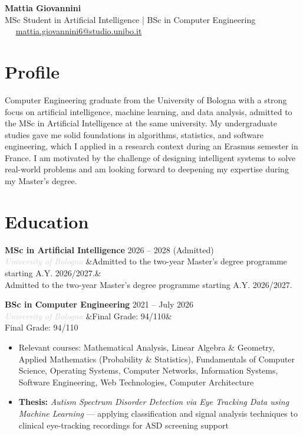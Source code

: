 \documentclass[a4paper,10pt]{article}
\newcommand{\entry}[4]{%
  \noindent\textbf{#1} \hfill \textcolor{accent}{#2}\\
  \textit{\textcolor{lightgray}{#3}}%
  \ifx&#4&\else\\\vspace{0.2em}#4\fi
  \vspace{0.5em}
}
\newcommand{\entrylist}[5]{%
  \noindent\textbf{#1} \hfill \textcolor{accent}{#2}\\
  \textit{\textcolor{lightgray}{#3}}%
  \ifx&#4&\else\\\vspace{0.2em}#4\fi
  \vspace{0.3em}
  \begin{itemize}#5\end{itemize}
  \vspace{0.3em}
}
\begin{document}
\begin{center}
  {\Huge\bfseries\color{darkgray} Mattia Giovannini}\\[0.4em]
  {\large\color{accent} MSc Student in Artificial Intelligence | BSc in Computer Engineering}\\[0.7em]
  \textcolor{lightgray}{
    \faPhone\ \PrivatePhone
    \quad\textbullet\quad
    \faEnvelope\ \href{mailto:mattia.giovannini6@studio.unibo.it}{mattia.giovannini6@studio.unibo.it}
  }
\end{center}

\vspace{0.5em}

\section{Profile}

Computer Engineering graduate from the University of Bologna with a strong focus on artificial
intelligence, machine learning, and data analysis, admitted to the MSc in Artificial Intelligence
at the same university. My undergraduate studies gave me solid foundations in algorithms, statistics,
and software engineering, which I applied in a research context during an Erasmus semester in France.
I am motivated by the challenge of designing intelligent systems to solve real-world problems and
am looking forward to deepening my expertise during my Master's degree.

\section{Education}

\entry{MSc in Artificial Intelligence}{2026 -- 2028 (Admitted)}{University of Bologna}
{Admitted to the two-year Master's degree programme starting A.Y. 2026/2027.}

\entrylist{BSc in Computer Engineering}{2021 -- July 2026}{University of Bologna}{Final Grade: 94/110}{
  \item Relevant courses: Mathematical Analysis, Linear Algebra \& Geometry,
        Applied Mathematics (Probability \& Statistics), Fundamentals of Computer Science,
        Operating Systems, Computer Networks, Information Systems,
        Software Engineering, Web Technologies, Computer Architecture
  \item \textbf{Thesis:} \textit{Autism Spectrum Disorder Detection via Eye Tracking Data
        using Machine Learning} — applying classification and signal analysis techniques
        to clinical eye-tracking recordings for ASD screening support
}
\end{document}
